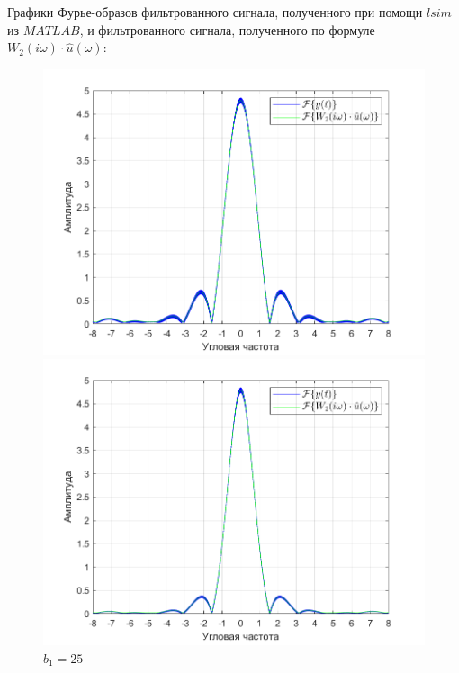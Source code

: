\documentclass[a4paper]{article}
\begin{document}
Графики Фурье-образов фильтрованного сигнала, полученного при помощи $lsim$ из $MATLAB$, и фильтрованного сигнала, полученного по формуле $W_2(i \omega) \cdot \hat{u}(\omega)$:

\begin{figure}[H]
    \begin{minipage}{0.5\textwidth}
        \centering
        \includegraphics[width=\linewidth]{ex1_2/a1=0_a2=25_b1=10.5_b2=25_d=5/h5.png}
        \caption{$b_1=10.5$}
    \end{minipage}
    \begin{minipage}{0.5\textwidth}
        \centering
        \includegraphics[width=\linewidth]{ex1_2/a1=0_a2=25_b1=25_b2=25_d=5/h5.png}
        \caption{$b_1=25$}
    \end{minipage}
\end{figure}
\end{document}
